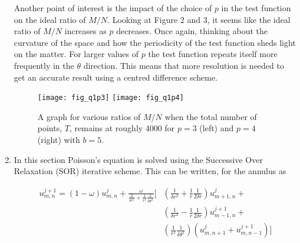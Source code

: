 \documentclass{article}
\begin{document}
\begin{enumerate}
	Another point of interest is the impact of the choice of $p$ in the test function on the ideal ratio of $M/N$. Looking at Figure 2 and 3, it seems like the ideal ratio of $M/N$ increases as $p$ decreases. Once again, thinking about the curvature of the space and how the periodicity of the test function sheds light on the matter. For larger values of $p$ the test function repeats itself more frequently in the $\theta$ direction. This means that more resolution is needed to get an accurate result using a centred difference scheme.
	
	\begin{figure}[h!]
		\centering
		\texttt{[image: fig\_q1p3]}
		\texttt{[image: fig\_q1p4]}
		\caption{A graph for various ratios of $M/N$ when the total number of points, $T$, remains at roughly $4000$ for $p=3$ (left) and $p=4$ (right) with $b=5$.}
	\end{figure}

	\item In this section Poisson's equation is solved using the Successive Over Relaxation (SOR) iterative scheme. This can be written, for the annulus as
	
	\begin{equation}
	\begin{split}
	 u^{j+1}_{m,n} = (1 - \omega)  u^j_{m,n} + \frac{\omega}{\frac{2}{\delta r^2} + \frac{1}{r^2}\frac{2}{\delta \theta^2}} [& (\frac{1}{\delta r^2} + \frac{1}{r}\frac{1}{2\delta r} ) u^j_{m+1,n} + \\& (\frac{1}{\delta r^2} - \frac{1}{r}\frac{1}{2\delta r} ) u^{j+1}_{m-1,n} + \\& (\frac{1}{r^2}\frac{1}{\delta \theta^2} ) ( u^j_{m,n+1} +  u^{j+1}_{m, n-1} ) ]	
	\end{split}
    \end{equation}
    

\end{enumerate}
\end{document}
